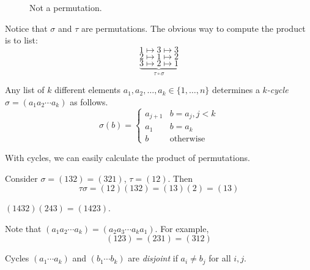\documentclass[10pt, a4paper, twoside]{report}
\begin{document}
\begin{example}
\begin{figure}[H]
        \caption*{Not a permutation.}
        \endminipage
        \end{figure}
        Notice that \(\sigma\) and \(\tau\) are permutations. The obvious way to compute the product is to list:
        \[1\mapsto 3\mapsto 3\]
        \[2\mapsto 1\mapsto 2\]
        \[\underbrace{3\mapsto 2\mapsto 1}_{\tau\circ\sigma}\]
\end{example}
\begin{definition}
    Any list of \(k\) different elements \(a_1,a_2,\ldots,a_k\in\{1,\ldots,n\}\) determines a \emph{\(k\)-cycle} \(\sigma=(a_1a_2\cdots a_k)\) as follows.
    \[\sigma(b)=\begin{cases}
        a_{j+1} & b=a_j,j<k \\
        a_1 & b=a_k \\
        b & \text{otherwise}
    \end{cases}\]
\end{definition}
With cycles, we can easily calculate the product of permutations. 
\begin{example}
    Consider \(\sigma=(132)=(321)\), \(\tau=(12)\). Then 
    \[\tau\sigma=(12)(132)=(13)(2)=(13)\]
\end{example}
\begin{example}
    \((1432)(243)=(1423)\).
\end{example}
\begin{remark}
    Note that \((a_1a_2\cdots a_k)=(a_2a_3\cdots a_ka_1)\). For example,
    \[(123)=(231)=(312)\]
\end{remark}
\begin{definition}
    Cycles \((a_1\cdots a_k)\) and \((b_1\cdots b_k)\) are \emph{disjoint} if \(a_i\neq b_j\) for all \(i,j\).
\end{definition}
\end{document}
